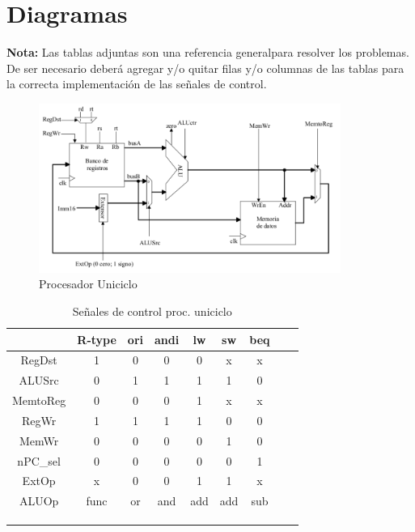 \documentclass[letterpaper,11pt,notitlepage]{article}
\begin{document}
\section*{Diagramas}
\textbf{Nota:} Las tablas adjuntas son una referencia generalpara resolver los problemas. De ser necesario deberá agregar y/o quitar filas y/o columnas de las tablas para la correcta implementación de las señales de control.
\begin{figure}[H]
\begin{center}
\includegraphics[width=0.88\textwidth,keepaspectratio=true]{unic}
\end{center}
\caption{Procesador Uniciclo}
\end{figure}

\begin{table}[H]
\begin{center}
\begin{tabular}{|c|c|c|c|c|c|c|c|c|} \hline
            & R-type  & ori & andi & lw & sw & beq &  & \\ \hline
RegDst      & 1       & 0   &0     & 0  & x  & x   &  &  \\ \hline
ALUSrc      & 0       & 1   &1     & 1  & 1  & 0   &  &  \\ \hline
MemtoReg    & 0       & 0   &0     & 1  & x  & x   &  &  \\ \hline
RegWr       & 1       & 1   &1     & 1  & 0  & 0   &  &  \\ \hline
MemWr       & 0       & 0   &0     & 0  & 1  & 0   &  &  \\ \hline
nPC\_sel     & 0       & 0   &0     & 0  & 0  & 1   & &  \\ \hline
ExtOp       & x       & 0   &0     & 1  & 1  & x   &  &  \\ \hline
ALUOp       & func    & or  &and   & add& add& sub & & \\ \hline
  &        &    &    &   &   &    &  &  \\ \hline
  &        &    &    &   &   &    &  &  \\ \hline
   &        &    &    &   &   &    &  &  \\ \hline
\end{tabular}
\end{center}
\caption{Señales de control proc. uniciclo}
\end{table}
\end{document}

